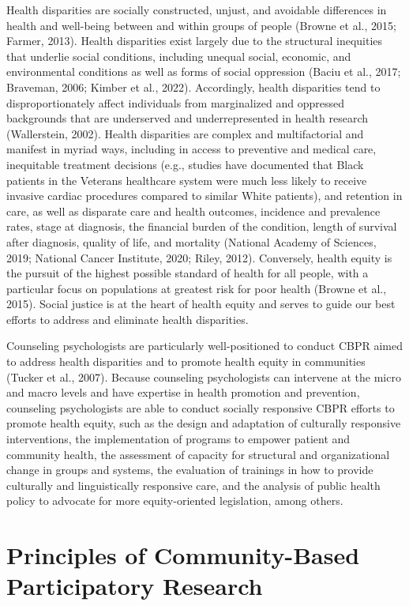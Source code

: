 \documentclass[
  11pt,
]{book}
\begin{document}
Health disparities are socially constructed, unjust, and avoidable differences in health and well-being between and within groups of people (Browne et al., 2015; Farmer, 2013). Health disparities exist largely due to the structural inequities that underlie social conditions, including unequal social, economic, and environmental conditions as well as forms of social oppression (Baciu et al., 2017; Braveman, 2006; Kimber et al., 2022). Accordingly, health disparities tend to disproportionately affect individuals from marginalized and oppressed backgrounds that are underserved and underrepresented in health research (Wallerstein, 2002). Health disparities are complex and multifactorial and manifest in myriad ways, including in access to preventive and medical care, inequitable treatment decisions (e.g., studies have documented that Black patients in the Veterans healthcare system were much less likely to receive invasive cardiac procedures compared to similar White patients), and retention in care, as well as disparate care and health outcomes, incidence and prevalence rates, stage at diagnosis, the financial burden of the condition, length of survival after diagnosis, quality of life, and mortality (National Academy of Sciences, 2019; National Cancer Institute, 2020; Riley, 2012). Conversely, health equity is the pursuit of the highest possible standard of health for all people, with a particular focus on populations at greatest risk for poor health (Browne et al., 2015). Social justice is at the heart of health equity and serves to guide our best efforts to address and eliminate health disparities.

Counseling psychologists are particularly well-positioned to conduct CBPR aimed to address health disparities and to promote health equity in communities (Tucker et al., 2007). Because counseling psychologists can intervene at the micro and macro levels and have expertise in health promotion and prevention, counseling psychologists are able to conduct socially responsive CBPR efforts to promote health equity, such as the design and adaptation of culturally responsive interventions, the implementation of programs to empower patient and community health, the assessment of capacity for structural and organizational change in groups and systems, the evaluation of trainings in how to provide culturally and linguistically responsive care, and the analysis of public health policy to advocate for more equity-oriented legislation, among others.

\hypertarget{principles-of-community-based-participatory-research}{%
\section{Principles of Community-Based Participatory Research}\label{principles-of-community-based-participatory-research}}
\end{document}
